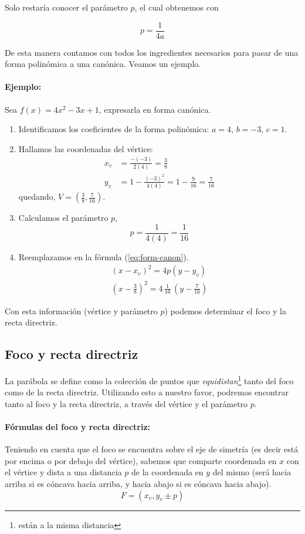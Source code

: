 \documentclass{article}
\begin{document}
 Solo restaría conocer el parámetro $p$, el cual obtenemos con

 \begin{equation}
     \label{eq:parametro}
     p=\frac{1}{4a}
 \end{equation}

De esta manera contamos con todos los ingredientes necesarios para pasar de una forma polinómica a una canónica. Veamos un ejemplo.

\paragraph{Ejemplo:} Sea $f(x)=4x^2-3x+1$, expresarla en forma canónica.

\begin{enumerate}
    \item Identificamos los coeficientes de la forma polinómica: $a=4$, $b=-3$, $c=1$.
    \item Hallamos las coordenadas del vértice:
    \begin{align*}
        x_v&=\frac{-(-3)}{2(4)}=\frac{3}{8}\\
        y_v&=1-\frac{(-3)^2}{4(4)}=1-\frac{9}{16}=\frac{7}{16}
    \end{align*}
    quedando, $V=(\frac{3}{8},\frac{7}{16})$.
    \item Calculamos el parámetro $p$, $$p=\frac{1}{4(4)}=\frac{1}{16}$$
    \item Reemplazamos en la fórmula (\ref{eq:form-canon}).
    \begin{gather*}
        (x-x_v)^2=4p(y-y_v)\\
        \left(x-\frac{3}{8}\right)^2=4\,\frac{1}{16}\,\left(y-\frac{7}{16}\right)
    \end{gather*}
\end{enumerate}

Con esta información (vértice y parámetro $p$) podemos determinar el foco y la recta directriz.

\subsection{Foco y recta directriz}
La parábola se define como la colección de puntos que \emph{equidistan}\footnote{están a la misma distancia} tanto del foco como de la recta directriz. Utilizando esto a nuestro favor, podremos encontrar tanto al foco y la recta directriz, a través del vértice y el parámetro $p$.

\paragraph{Fórmulas del foco y recta directriz:} Teniendo en cuenta que el foco se encuentra sobre el eje de simetría (es decir está por encima o por debajo del vértice), sabemos que comparte coordenada en $x$ con el vértice y dista a una distancia $p$ de la coordenada en $y$ del mismo (será hacia arriba si es cóncava hacia arriba, y hacia abajo si es cóncava hacia abajo).
\begin{equation}
    \label{eq:foco}
    F=(x_v,y_v\pm p)
\end{equation}
\end{document}
